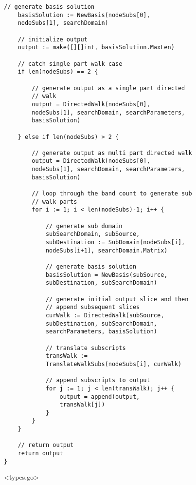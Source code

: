 \begin{lstlisting}[basicstyle=\small]
	// generate basis solution
	basisSolution := NewBasis(nodeSubs[0], 
	nodeSubs[1], searchDomain)

	// initialize output
	output := make([][]int, basisSolution.MaxLen)

	// catch single part walk case
	if len(nodeSubs) == 2 {

		// generate output as a single part directed 
		// walk
		output = DirectedWalk(nodeSubs[0], 
		nodeSubs[1], searchDomain, searchParameters, 
		basisSolution)

	} else if len(nodeSubs) > 2 {

		// generate output as multi part directed walk
		output = DirectedWalk(nodeSubs[0], 
		nodeSubs[1], searchDomain, searchParameters, 
		basisSolution)

		// loop through the band count to generate sub 
		// walk parts
		for i := 1; i < len(nodeSubs)-1; i++ {

			// generate sub domain
			subSearchDomain, subSource, 
			subDestination := SubDomain(nodeSubs[i], 
			nodeSubs[i+1], searchDomain.Matrix)

			// generate basis solution
			basisSolution = NewBasis(subSource, 
			subDestination, subSearchDomain)

			// generate initial output slice and then 
			// append subsequent slices
			curWalk := DirectedWalk(subSource, 
			subDestination, subSearchDomain, 
			searchParameters, basisSolution)

			// translate subscripts
			transWalk := 
			TranslateWalkSubs(nodeSubs[i], curWalk)

			// append subscripts to output
			for j := 1; j < len(transWalk); j++ {
				output = append(output, 
				transWalk[j])
			}
		}
	}

	// return output
	return output
}

\end{lstlisting}

\newpage

<types.go>

